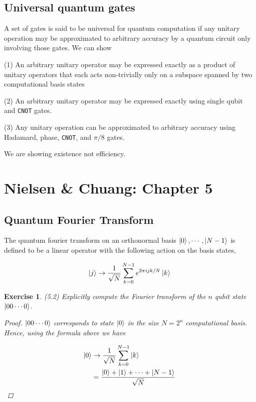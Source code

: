 \documentclass[11pt]{article}
\newcommand\0{\mathbf{0}}
\newcommand\<{\langle}
\renewcommand\>{\rangle}
\newtheorem{exercise}[theorem]{Exercise}
\begin{document}
\subsection{Universal quantum gates}

A set of gates is said to be universal for quantum computation if any unitary operation may be approximated to arbitrary accuracy by a quantum circuit only involving those gates. We can show

(1) An arbitrary unitary operator may be expressed exactly as a product of unitary operators that each acts non-trivially only on a subspace spanned by two computational basis states

(2) An arbitrary unitary operator may be expressed exactly using single qubit and \texttt{CNOT} gates.

(3) Any unitary operation can be approximated to arbitrary accuracy using Hadamard, phase, \texttt{CNOT}, and $\pi / 8$ gates.

We are showing existence not efficiency.

\section{Nielsen \& Chuang: Chapter 5}

\subsection{Quantum Fourier Transform}

The quantum fourier transform on an orthonormal basis $\ket{0}, \cdots ,\ket{N - 1}$ is defined to be a linear operator with the following action on the basis states,

\begin{align*}
\ket{j} \rightarrow \frac{1}{\sqrt{N}} \sum_{k=0}^{N-1} e^{2\pi i jk / N} \ket{k}	
\end{align*}


\begin{exercise}(5.2) Explicitly compute the Fourier transform of the $n$ qubit state $\ket{00\cdots 0}$.
\begin{proof}
	$\ket{00 \cdots 0 }$ corresponds to state $\ket{0}$ in the size $N = 2^n$ computational basis. Hence, using the formula above we have 
	
	\begin{align*}
	\ket{0} &\rightarrow \frac{1}{\sqrt{N}} \sum_{k=0}^{N-1} \ket{k} \\
	&= 	\frac{\ket{0} + \ket{1} + \cdots + \ket{N-1}}{\sqrt{N}}
	\end{align*}

\end{proof}
	
\end{exercise}
\end{document}
